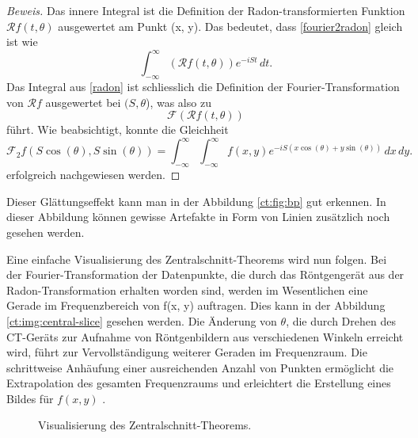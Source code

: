 \begin{proof}[Beweis]
	Das innere Integral ist die Definition der Radon-transformierten Funktion $\mathscr{R}f(t, \theta)$ ausgewertet am Punkt (x, y). Das bedeutet, dass \eqref{fourier2radon} gleich ist wie
	\begin{equation}\label{radon}
		\int_{-\infty}^{\infty} (\mathscr{R}f(t, \theta)) e^{-iSt}\,dt.
	\end{equation}
	Das Integral aus \eqref{radon} ist schliesslich die Definition der Fourier-Transformation von $\mathscr{R}f$ ausgewertet bei $(S, \theta$), was also zu
	\begin{equation}\label{fourier1radon}
		\mathscr{F}(\mathscr{R}f(t, \theta))
	\end{equation}
	führt. Wie beabsichtigt, konnte die Gleichheit 
	\begin{equation}
		\mathscr{F}_2f(S\cos(\theta), S\sin(\theta)) = \int_{-\infty}^{\infty}\int_{-\infty}^{\infty} f(x, y)e^{-iS(x\cos(\theta)+y\sin(\theta))}\,dx\,dy.
	\end{equation}
	erfolgreich nachgewiesen werden.
\end{proof}

Dieser Glättungseffekt kann man in der Abbildung \ref{ct:fig:bp} gut erkennen. In dieser Abbildung können gewisse Artefakte in Form von Linien zusätzlich noch gesehen werden.

Eine einfache Visualisierung des Zentralschnitt-Theorems wird nun folgen. Bei der Fourier-Transformation der Datenpunkte, die durch das Röntgengerät aus der Radon-Transformation erhalten worden sind, werden im Wesentlichen eine Gerade im Frequenzbereich von f(x, y) auftragen. Dies kann in der Abbildung \ref{ct:img:central-slice} gesehen werden. 
Die Änderung von $\theta$, die durch Drehen des CT-Geräts zur Aufnahme von Röntgenbildern aus verschiedenen Winkeln erreicht wird, führt zur Vervollständigung weiterer Geraden im Frequenzraum. Die schrittweise Anhäufung einer ausreichenden Anzahl von Punkten ermöglicht die Extrapolation des gesamten Frequenzraums und erleichtert die Erstellung eines Bildes für $f(x, y)$ \cite{ct:condensate}.
\begin{figure}
	\centering
	\caption{Visualisierung des Zentralschnitt-Theorems.}
\end{figure}


